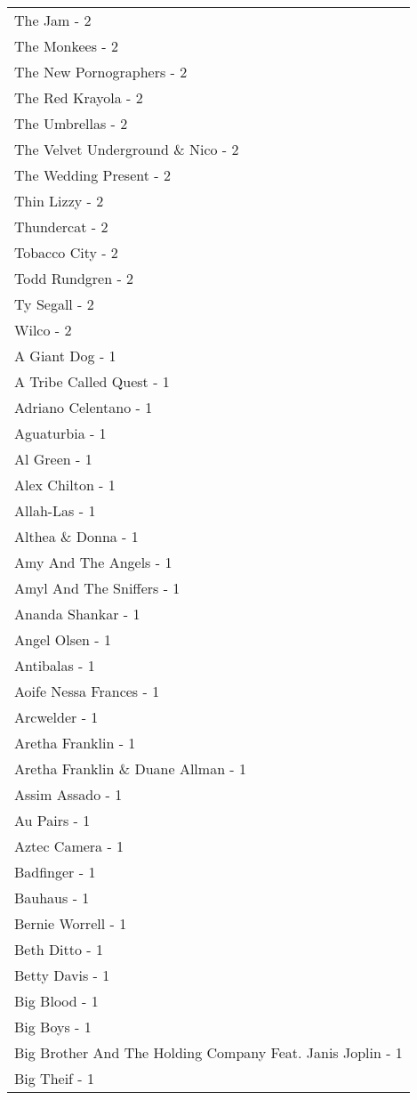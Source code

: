 \documentclass[
]{article}
\begin{document}
\begin{longtable}{l}
The Jam - 2 \\ 
The Monkees - 2 \\ 
The New Pornographers - 2 \\ 
The Red Krayola - 2 \\ 
The Umbrellas - 2 \\ 
The Velvet Underground \& Nico - 2 \\ 
The Wedding Present - 2 \\ 
Thin Lizzy - 2 \\ 
Thundercat - 2 \\ 
Tobacco City - 2 \\ 
Todd Rundgren - 2 \\ 
Ty Segall - 2 \\ 
Wilco - 2 \\ 
A Giant Dog - 1 \\ 
A Tribe Called Quest - 1 \\ 
Adriano Celentano - 1 \\ 
Aguaturbia - 1 \\ 
Al Green - 1 \\ 
Alex Chilton - 1 \\ 
Allah-Las - 1 \\ 
Althea \& Donna - 1 \\ 
Amy And The Angels - 1 \\ 
Amyl And The Sniffers - 1 \\ 
Ananda Shankar - 1 \\ 
Angel Olsen - 1 \\ 
Antibalas - 1 \\ 
Aoife Nessa Frances - 1 \\ 
Arcwelder - 1 \\ 
Aretha Franklin - 1 \\ 
Aretha Franklin \& Duane Allman - 1 \\ 
Assim Assado - 1 \\ 
Au Pairs - 1 \\ 
Aztec Camera - 1 \\ 
Badfinger - 1 \\ 
Bauhaus - 1 \\ 
Bernie Worrell - 1 \\ 
Beth Ditto - 1 \\ 
Betty Davis - 1 \\ 
Big Blood - 1 \\ 
Big Boys - 1 \\ 
Big Brother And The Holding Company Feat. Janis Joplin - 1 \\ 
Big Theif - 1 \\ 

\end{longtable}
\end{document}
